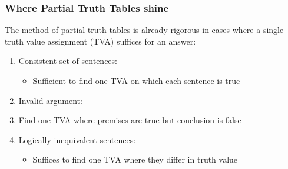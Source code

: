 \begin{frame}
\frametitle{Where Partial Truth Tables shine}

The method of partial truth tables is already rigorous in cases where a single truth value assignment (TVA) suffices for an answer:

\begin{enumerate}[<+->]

\item Consistent set of sentences:

\begin{itemize}

\item Sufficient to find one TVA on which each sentence is true  

\end{itemize}

\item Invalid argument:

\bi

\item Find one TVA where premises are true but conclusion is false

\ei 

\item Logically inequivalent sentences:

\begin{itemize}

\item Suffices to find one TVA where they differ in truth value  

\end{itemize}

\end{enumerate}
\end{frame}

